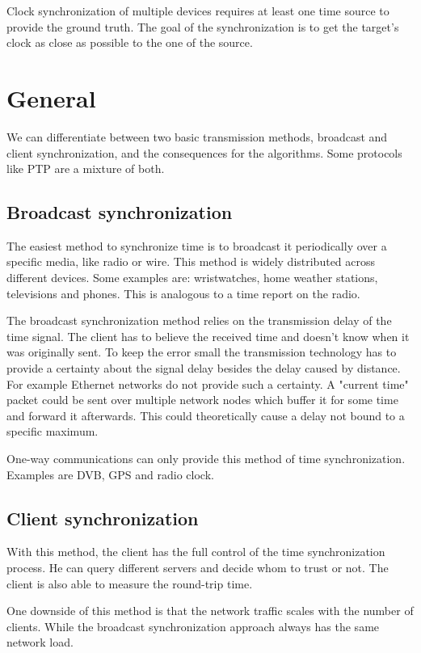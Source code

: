Clock synchronization of multiple devices requires at least one time source to provide the ground truth. The goal of the synchronization is to get the target’s clock as close as possible to the one of the source.

\section{General}

We can differentiate between two basic transmission methods, broadcast and client synchronization, and the consequences for the algorithms. Some protocols like PTP are a mixture of both.

\subsection{Broadcast synchronization}

The easiest method to synchronize time is to broadcast it periodically over a specific media, like radio or wire. This method is widely distributed across different devices. Some examples are: wristwatches, home weather stations, televisions and phones. This is analogous to a time report on the radio.

The broadcast synchronization method relies on the transmission delay of the time signal. The client has to believe the received time and doesn’t know when it was originally sent. To keep the error small the transmission technology has to provide a certainty about the signal delay besides the delay caused by distance. For example Ethernet networks do not provide such a certainty. A "current time" packet could be sent over multiple network nodes which buffer it for some time and forward it afterwards. This could theoretically cause a delay not bound to a specific maximum.

One-way communications can only provide this method of time synchronization. Examples are DVB, GPS and radio clock.

\subsection{Client synchronization}

With this method, the client has the full control of the time synchronization process. He can query different servers and decide whom to trust or not. The client is also able to measure the round-trip time.

One downside of this method is that the network traffic scales with the number of clients. While the broadcast synchronization approach always has the same network load.

